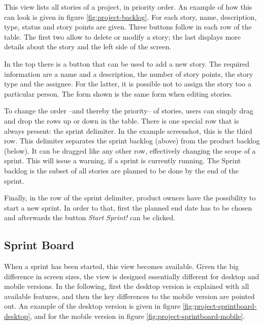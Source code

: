 \documentclass[
	accentcolor=tud1a %
]{tudreport}
\begin{document}
This view lists all stories of a project, in priority order. An example of how this can look is given in figure \ref{fig:project-backlog}. For each story, name, description, type, status and story points are given. Three buttons follow in each row of the table. The first two allow to delete or modify a story; the last displays more details about the story and the left side of the screen.

In the top there is a button that can be used to add a new story. The required information are a name and a description, the number of story points, the story type and the assignee. For the latter, it is possible not to assign the story too a particular person. The form shown is the same form when editing stories.

To change the order --and thereby the priority-- of stories, users can simply drag and drop the rows up or down in the table. There is one special row that is always present: the sprint delimiter. In the example screenshot, this is the third row. This delimiter separates the sprint backlog (above) from the product backlog (below). It can be dragged like any other row, effectively changing the scope of a sprint. This will issue a warning, if a sprint is currently running. The Sprint backlog is the subset of all stories are planned to be done by the end of the sprint.

Finally, in the row of the sprint delimiter, product owners have the possibility to start a new sprint. In order to that, first the planned end date has to be chosen and afterwards the button \emph{Start Sprint!} can be clicked.

\subsection{Sprint Board}
\label{sec:sprint-board}


When a sprint has been started, this view becomes available. Given the big difference in screen sizes, the view is designed essentially different for desktop and mobile versions. In the following, first the desktop version is explained with all available features, and then the key differences to the mobile version are pointed out. An example of the desktop version is given in figure \ref{fig:project-sprintboard-desktop}, and for the mobile version in figure \ref{fig:project-sprintboard-mobile}.
\end{document}
